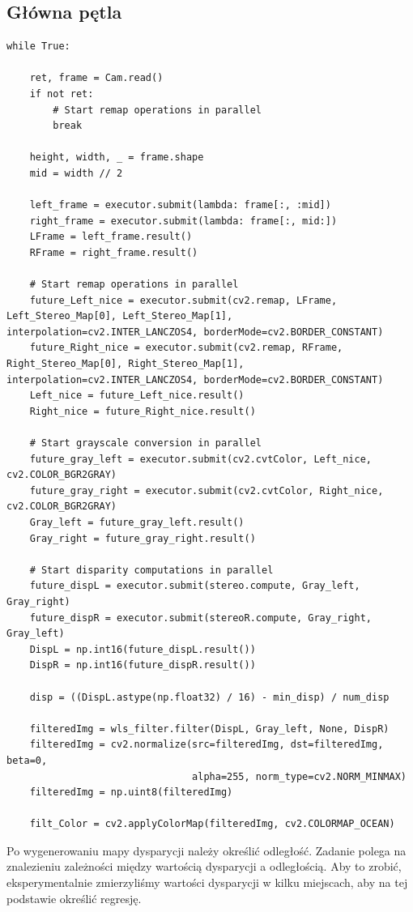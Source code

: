 \documentclass[magisterska]{pracadypl}
\begin{document}
\subsection{Główna pętla}

\begin{lstlisting}[style=mypython]
while True:

    ret, frame = Cam.read()
    if not ret:
        # Start remap operations in parallel
        break

    height, width, _ = frame.shape
    mid = width // 2

    left_frame = executor.submit(lambda: frame[:, :mid])
    right_frame = executor.submit(lambda: frame[:, mid:])
    LFrame = left_frame.result()
    RFrame = right_frame.result()

    # Start remap operations in parallel
    future_Left_nice = executor.submit(cv2.remap, LFrame, Left_Stereo_Map[0], Left_Stereo_Map[1], interpolation=cv2.INTER_LANCZOS4, borderMode=cv2.BORDER_CONSTANT)
    future_Right_nice = executor.submit(cv2.remap, RFrame, Right_Stereo_Map[0], Right_Stereo_Map[1], interpolation=cv2.INTER_LANCZOS4, borderMode=cv2.BORDER_CONSTANT)
    Left_nice = future_Left_nice.result()
    Right_nice = future_Right_nice.result()

    # Start grayscale conversion in parallel
    future_gray_left = executor.submit(cv2.cvtColor, Left_nice, cv2.COLOR_BGR2GRAY)
    future_gray_right = executor.submit(cv2.cvtColor, Right_nice, cv2.COLOR_BGR2GRAY)
    Gray_left = future_gray_left.result()
    Gray_right = future_gray_right.result()

    # Start disparity computations in parallel
    future_dispL = executor.submit(stereo.compute, Gray_left, Gray_right)
    future_dispR = executor.submit(stereoR.compute, Gray_right, Gray_left)
    DispL = np.int16(future_dispL.result())
    DispR = np.int16(future_dispR.result())

    disp = ((DispL.astype(np.float32) / 16) - min_disp) / num_disp

    filteredImg = wls_filter.filter(DispL, Gray_left, None, DispR)
    filteredImg = cv2.normalize(src=filteredImg, dst=filteredImg, beta=0, 
                                alpha=255, norm_type=cv2.NORM_MINMAX)
    filteredImg = np.uint8(filteredImg)

    filt_Color = cv2.applyColorMap(filteredImg, cv2.COLORMAP_OCEAN)
\end{lstlisting}

Po wygenerowaniu mapy dysparycji należy określić odległość. Zadanie polega na znalezieniu zależności między wartością dysparycji a odległością. Aby to zrobić, eksperymentalnie zmierzyliśmy wartości dysparycji w kilku miejscach, aby na tej podstawie określić regresję.
\end{document}
